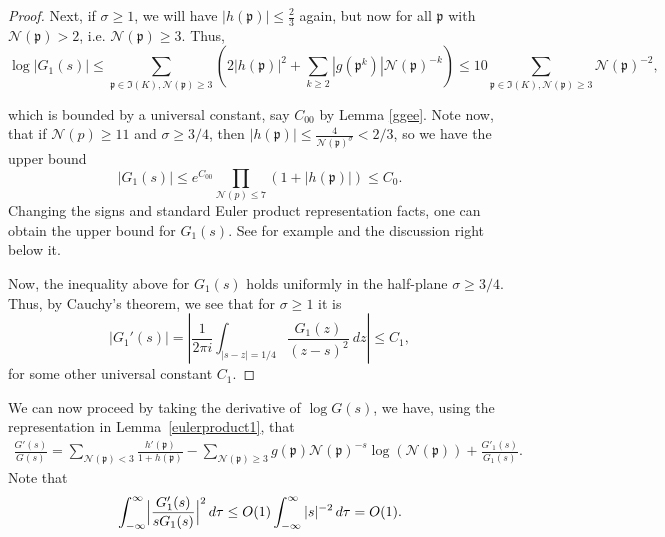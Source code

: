 \documentclass[11pt]{amsart}
\theoremstyle{definition}
\newcommand{\NN}{{\mathcal N}}
\newcommand{\mf}{\mathfrak}
\begin{document}
\begin{proof}
Next, if $\sigma \geq 1$, we will have $|h(\mf p)|\leq \frac{2}{3}$ again, but now for all $\mf p$ with $\NN(\mf p)>2$, i.e. $\NN(\mf p) \ge 3$. Thus,
\[
\log |G_1(s)| \leq \sum_{\mf p \in \mf I(K), \NN(\mf p) \geq 3} \left( 2|h(\mf p)|^2+\sum_{k \geq 2} |g(\mf p^k)| \NN(\mf p)^{-k}\right) \leq 10\sum_{\mf p \in \mf I(K), \NN(\mf p) \geq 3} \NN(\mf p)^{-2},\]

which is bounded by a universal constant, say $C_{00}$ by Lemma \ref{ggee}. Note now, that if $\NN(p)\geq 11$ and $\sigma \geq 3/4$, then $|h(\mf p)| \leq \frac{4}{\NN(\mf p)^{\sigma}}<2/3$, so we have the upper bound
\[
|G_1(s)| \leq e^{C_{00}} \prod_{\NN(p) \leq 7} (1+|h(\mf p)|)\leq C_0.
\]
Changing the signs and standard Euler product representation facts, one can obtain the upper bound for $G_1(s)$. See for example \cite[Lemma~2.13]{E79book} and the discussion right below it.

Now, the inequality above for $G_1(s)$ holds uniformly in the half-plane $\sigma \geq 3/4$. Thus, by Cauchy's theorem, we see that for $\sigma \geq 1$ it is
\[
|G_1'(s)| = \left| \frac{1}{2\pi i} \int_{|s-z|=1/4} \frac{G_1(z)}{(z-s)^2} \ dz \right|\leq C_1,
\]
for some other universal constant $C_1$.
\end{proof}

We can now proceed by taking the derivative of $\log G(s)$, we have, using the representation in Lemma~\ref{eulerproduct1}, that
\begin{equation}\label{gergw2}
    \begin{split}
    \frac{G'(s)}{G(s)}=\sum_{\NN(\mf p)<3}\frac{h'(\mf p)}{1+h(\mf p)}-\sum_{\NN(\mf p)\geq 3}g(\mf p)\NN(\mf p)^{-s}\log(\NN(\mf p))+\frac{G'_{1}(s)}{G_{1}(s)}.
    \end{split}
 \end{equation}
Note that
  \begin{equation}\label{gergw}
    \begin{split}
       \int_{-\infty}^{\infty}\Bigl\vert\frac{G'_{1}(s)}{s G_{1}(s)}\Bigr\vert^{2}\,d\tau
       \leq O(1)\int_{-\infty}^{\infty}\vert s\vert^{-2}\,d\tau=O(1).
    \end{split}
 \end{equation}
 
\end{document}
